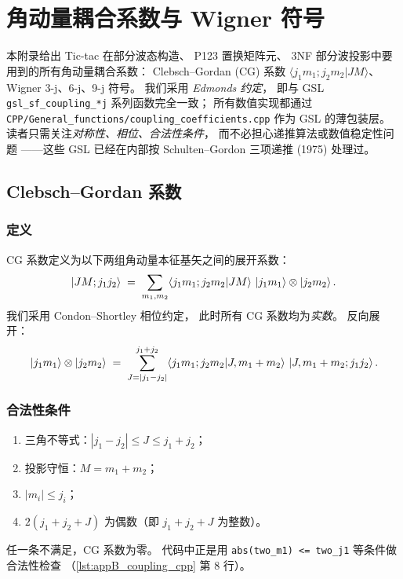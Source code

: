 
\chapter{角动量耦合系数与 Wigner 符号}
\label{app:B_wigner}

\noindent
本附录给出 Tic-tac 在部分波态构造、
P123 置换矩阵元、
3NF 部分波投影中要用到的所有角动量耦合系数：
Clebsch–Gordan (CG) 系数 $\langle j_1 m_1; j_2 m_2 | J M\rangle$、
Wigner 3-j、6-j、9-j 符号。
我们采用 \emph{Edmonds 约定}\cite{Edmonds1957}，
即与 GSL \texttt{gsl\_sf\_coupling\_*j} 系列函数完全一致；
所有数值实现都通过 \texttt{CPP/General\_functions/coupling\_coefficients.cpp}
作为 GSL 的薄包装层。
读者只需关注\emph{对称性、相位、合法性条件}，
而不必担心递推算法或数值稳定性问题
——这些 GSL 已经在内部按 Schulten–Gordon 三项递推 (1975) 处理过。

\section{Clebsch–Gordan 系数}
\label{sec:appB_clebsch_gordan}

\subsection{定义}

CG 系数定义为以下两组角动量本征基矢之间的展开系数：
\begin{equation}
\ket{J M; j_1 j_2} \;=\; \sum_{m_1, m_2}
\langle j_1 m_1; j_2 m_2 | J M \rangle\,
\ket{j_1 m_1}\otimes \ket{j_2 m_2}.
\label{eq:appB_CG_def}
\end{equation}
我们采用 Condon–Shortley 相位约定，
此时所有 CG 系数均为\emph{实数}。
反向展开：
\begin{equation}
\ket{j_1 m_1}\otimes \ket{j_2 m_2} \;=\; \sum_{J=|j_1-j_2|}^{j_1+j_2}
\langle j_1 m_1; j_2 m_2 | J, m_1+m_2 \rangle\,
\ket{J, m_1+m_2; j_1 j_2}.
\end{equation}

\subsection{合法性条件}

\begin{enumerate}
\item 三角不等式：$|j_1 - j_2| \le J \le j_1 + j_2$；
\item 投影守恒：$M = m_1 + m_2$；
\item $|m_i| \le j_i$；
\item $2(j_1 + j_2 + J)$ 为偶数（即 $j_1+j_2+J$ 为整数）。
\end{enumerate}
任一条不满足，CG 系数为零。
代码中正是用 \texttt{abs(two\_m1) <= two\_j1} 等条件做合法性检查
（\cref{lst:appB_coupling_cpp} 第 8 行）。

